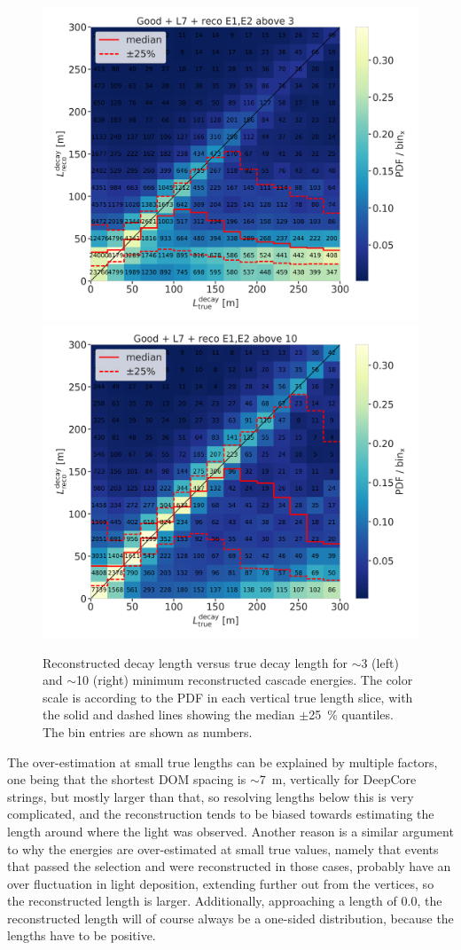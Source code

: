 \begin{figure}[h]
    \centering
    \includegraphics[width=0.49\linewidth]{figures/results/190607/resolutions/190607_millipede_level_no_NaNs_NEW_flipped_reco_decayL_vs_true_decayL_reco_above3_step_contours.png}
    \includegraphics[width=0.49\linewidth]{figures/results/190607/resolutions/190607_millipede_level_no_NaNs_NEW_flipped_reco_decayL_vs_true_decayL_reco_above10_step_contours.png}
    \caption[Preliminary 2-d reconstructed versus true decay length resolutions]{Reconstructed decay length versus true decay length for $\sim$\SI{3}{\gev} (left) and $\sim$\SI{10}{\gev} (right) minimum reconstructed cascade energies. The color scale is according to the PDF in each vertical true length slice, with the solid and dashed lines showing the median $\pm$\SI{25}{\percent} quantiles. The bin entries are shown as numbers.}
\end{figure}

The over-estimation at small true lengths can be explained by multiple factors, one being that the shortest DOM spacing is $\sim$\SI{7}{\meter}, vertically for DeepCore strings, but mostly larger than that, so resolving lengths below this is very complicated, and the reconstruction tends to be biased towards estimating the length around where the light was observed. Another reason is a similar argument to why the energies are over-estimated at small true values, namely that events that passed the selection and were reconstructed in those cases, probably have an over fluctuation in light deposition, extending further out from the vertices, so the reconstructed length is larger. Additionally, approaching a length of 0.0, the reconstructed length will of course always be a one-sided distribution, because the lengths have to be positive.

